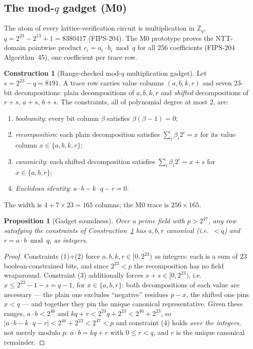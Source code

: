 \documentclass[11pt]{article}
\theoremstyle{plain}
\newtheorem{proposition}[theorem]{Proposition}
\theoremstyle{definition}
\newtheorem{construction}[theorem]{Construction}
\theoremstyle{remark}
\begin{document}
\subsection{The mod-$q$ gadget (M0)}
\label{sec:air-gadget}

The atom of every lattice-verification circuit is multiplication in
$\mathbb{Z}_q$, $q = 2^{23} - 2^{13} + 1 = 8380417$ (FIPS-204). The M0
prototype proves the NTT-domain pointwise product
$c_i = a_i \cdot b_i \bmod q$ for all $256$ coefficients (FIPS-204
Algorithm~45), one coefficient per trace row.

\begin{construction}[Range-checked mod-$q$ multiplication gadget]
\label{con:modq}
Let $s = 2^{23} - q = 8191$. A trace row carries value columns
$(a, b, k, r)$ and seven 23-bit decompositions: plain decompositions of
$a, b, k, r$ and \emph{shifted} decompositions of $r + s$, $a + s$,
$b + s$. The constraints, all of polynomial degree at most 2, are:
\begin{enumerate}[leftmargin=1.6em]
\item \emph{booleanity}: every bit column $\beta$ satisfies
  $\beta(\beta - 1) = 0$;
\item \emph{recomposition}: each plain decomposition satisfies
  $\sum_i \beta_i 2^i = x$ for its value column $x \in \{a, b, k, r\}$;
\item \emph{canonicity}: each shifted decomposition satisfies
  $\sum_i \beta_i 2^i = x + s$ for $x \in \{a, b, r\}$;
\item \emph{Euclidean identity}: $a \cdot b - k \cdot q - r = 0$.
\end{enumerate}
The width is $4 + 7 \times 23 = 165$ columns; the M0 trace is
$256 \times 165$.
\end{construction}

\begin{proposition}[Gadget soundness]
\label{prop:modq}
Over a prime field with $p > 2^{47}$, any row satisfying the constraints of
Construction~\ref{con:modq} has $a, b, r$ canonical (i.e.\ $< q$) and
$r = a \cdot b \bmod q$, as integers.
\end{proposition}

\begin{proof}
Constraints (1)+(2) force $a, b, k, r \in [0, 2^{23})$ as integers: each is
a sum of 23 boolean-constrained bits, and since $2^{23} < p$ the
recomposition has no field wraparound. Constraint (3) additionally forces
$x + s \in [0, 2^{23})$, i.e.\ $x \le 2^{23} - 1 - s = q - 1$, for
$x \in \{a, b, r\}$: both decompositions of each value are necessary --- the
plain one excludes ``negative'' residues $p - x$, the shifted one pins
$x < q$ --- and together they pin the unique canonical representative.
Given these ranges, $a \cdot b < 2^{46}$ and $k q + r < 2^{23} q + 2^{23}
< 2^{46} + 2^{23}$, so $|a \cdot b - k \cdot q - r| < 2^{46} + 2^{23} <
2^{47} < p$ and constraint (4) holds \emph{over the integers}, not merely
modulo $p$: $a \cdot b = k q + r$ with $0 \le r < q$, and $r$ is the unique
canonical remainder.
\end{proof}
\end{document}
